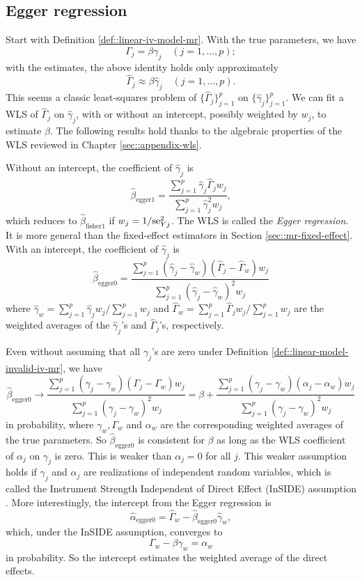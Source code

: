\subsection{Egger regression}


Start with Definition \ref{def::linear-iv-model-mr}. 
With the true parameters, we have
$$
\Gamma_j = \beta \gamma_j \quad (j=1,\ldots, p);
$$
with the estimates, the above identity holds only approximately
$$
\hat \Gamma_j \approx  \beta \hat \gamma_j \quad (j=1,\ldots, p).
$$
This seems a classic least-squares problem of $\{\hat \Gamma_j \}_{j=1}^p$ on $\{\hat \gamma_j \}_{j=1}^p$. We can fit a WLS of $\hat \Gamma_j$ on $\hat \gamma_j$, with or without an intercept, possibly weighted by $w_j$, to estimate $\beta$. The following results hold thanks to the algebraic properties of the WLS reviewed in Chapter \ref{sec::appendix-wls}. 


Without an intercept, the coefficient of $\hat \gamma_j$ is
$$
\hat{\beta}_{\text{egger}1}  = \frac{  \sum_{j=1}^p  \hat \gamma_j  \hat \Gamma_j w_j     }{ \sum_{j=1}^p  \hat \gamma_j ^2 w_j },
$$
which reduces to $\hat{\beta}_{\text{fisher}1} $ if $w_j =  1/\textup{se}_{Yj}^2$.  The WLS is called the {\it Egger regression}. 
It is more general than the fixed-effect estimators in Section \ref{sec::mr-fixed-effect}.  
With an intercept, the coefficient of $\hat \gamma_j$ is 
$$
\hat{\beta}_{\text{egger}0}  =  \frac{  \sum_{j=1}^p  (\hat \gamma_j  - \hat \gamma_w) (\hat \Gamma_j - \hat \Gamma_w) w_j     }
{ \sum_{j=1}^p  (\hat \gamma_j  - \hat \gamma_w) ^2 w_j }
$$
where $\hat \gamma_w = \sum_{j=1}^p \hat \gamma_j w_j /  \sum_{j=1}^p   w_j  $ and $\hat \Gamma_w = \sum_{j=1}^p \hat \Gamma_j w_j /  \sum_{j=1}^p   w_j  $  are the weighted averages of the $\hat \gamma_j$'s and $\hat \Gamma_j$'s, respectively. 





Even without assuming that all $\gamma_j$'s are zero under Definition \ref{def::linear-model-invalid-iv-mr}, we have
$$
\hat{\beta}_{\text{egger}0} \rightarrow 
\frac{  \sum_{j=1}^p  (  \gamma_j  -   \gamma_w) ( \Gamma_j -   \Gamma_w) w_j     }
{ \sum_{j=1}^p  (  \gamma_j  -  \gamma_w) ^2 w_j }
=\beta + \frac{  \sum_{j=1}^p  (  \gamma_j  -   \gamma_w) ( \alpha_j -   \alpha_w) w_j     }
{ \sum_{j=1}^p  (  \gamma_j  -  \gamma_w) ^2 w_j }
$$
in probability, where $\gamma_w, \Gamma_w$ and $\alpha_w$ are the corresponding weighted averages of the true parameters. So $\hat{\beta}_{\text{egger}0} $ is consistent for $\beta$ as long as the WLS coefficient of $\alpha_j$ on $\gamma_j$ is zero. This is weaker than $\alpha_j=0$ for all $j$. This weaker assumption holds if $\gamma_j$ and $\alpha_j$ are realizations of independent random variables, which is called the Instrument Strength Independent of Direct Effect (InSIDE) assumption \citep{bowden2015mendelian}. More interestingly, the intercept from the Egger regression is
$$
\hat{\alpha}_{\text{egger}0}  = \hat \Gamma_w - \hat{\beta}_{\text{egger}0}  \hat \gamma_w,
$$
which, under the InSIDE assumption, converges to
$$
\Gamma_w -  \beta  \gamma_w = \alpha_w
$$
in probability. So the intercept estimates the weighted average of the direct effects. 


